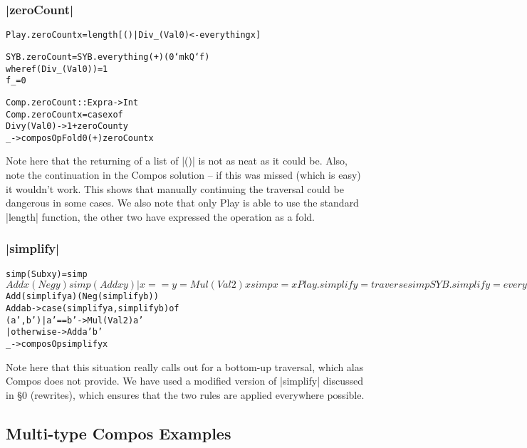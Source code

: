 \documentclass[preprint]{sigplanconf}
\newenvironment{code}{\begin{alltt}\small}{\end{alltt}}
\begin{document}
\subsubsection{|zeroCount|}

\begin{code}
Play.zeroCount x = length [() | Div _ (Val 0) <- everything x]

SYB.zeroCount = SYB.everything (+) (0 `mkQ` f)
    where  f (Div _ (Val 0))  = 1
           f _                = 0

Comp.zeroCount :: Expr a -> Int
Comp.zeroCount x = case x of
    Div y (Val 0) -> 1 + zeroCount y
    _ -> composOpFold 0 (+) zeroCount x
\end{code}

Note here that the returning of a list of |()| is not as neat as it could be. Also, note the continuation in the Compos solution -- if this was missed (which is easy) it wouldn't work. This shows that manually continuing the traversal could be dangerous in some cases. We also note that only Play is able to use the standard |length| function, the other two have expressed the operation as a fold.

\subsubsection{|simplify|}

\begin{code}
simp (Sub x y)           = simp $ Add x (Neg y)
simp (Add x y) | x == y  = Mul (Val 2) x
simp x                   = x

Play.simplify = traverse simp

SYB.simplify = everywhere (mkT simp)

Comp.simplify :: Expr a -> Expr a
Comp.simplify x = case x of
    Sub  a b -> simplify $ Add (simplify a) (Neg (simplify b))
    Add  a b -> case  (simplify a, simplify b) of
                      (a',b')  | a' == b'   -> Mul (Val 2) a'
                               | otherwise  -> Add a' b'
    _ -> composOp simplify x
\end{code}

Note here that this situation really calls out for a bottom-up traversal, which alas Compos does not provide. We have used a modified version of |simplify| discussed in \S0 (rewrites), which ensures that the two rules are applied everywhere possible.


\subsection{Multi-type Compos Examples}
\end{document}
